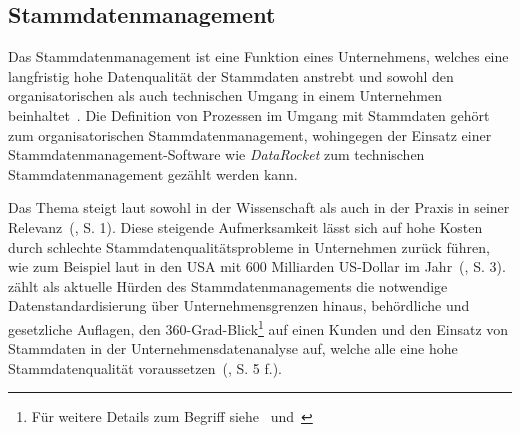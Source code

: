 \documentclass[
  language=german, %
  type=bachelor%
]{isthesis}
\begin{document}
\begin{content}


  \section{Stammdatenmanagement}
	Das Stammdatenmanagement ist eine Funktion eines Unternehmens, welches eine
	langfristig hohe Datenqualität der Stammdaten anstrebt und sowohl den
	organisatorischen als auch technischen Umgang in einem Unternehmen
	beinhaltet~\cite[][S.  2]{legner2007stammdaten}.  Die Definition von
	Prozessen im Umgang mit Stammdaten gehört \zB{} zum organisatorischen
	Stammdatenmanagement, wohingegen der Einsatz einer Stammdatenmanagement-Software
	wie \textit{DataRocket} zum technischen Stammdatenmanagement gezählt werden
	kann.  

  Das Thema steigt laut \textsc{\citeauthor{otto2012design}} sowohl in der
  Wissenschaft als auch in der Praxis in seiner
  Relevanz~(\citeyear{otto2012design}, S. 1). Diese steigende Aufmerksamkeit
  lässt sich auf hohe Kosten durch schlechte Stammdatenqualitätsprobleme in
  Unternehmen zurück führen, wie zum Beispiel laut
  \textsc{\citeauthor{eckerson2002data}} in den USA mit 600 Milliarden
  US-Dollar im Jahr~(\cite{eckerson2002data}, S. 3).
  \textsc{\citeauthor{otto2011stammdatenmanagement}} zählt als aktuelle Hürden
  des Stammdatenmanagements die notwendige Datenstandardisierung über
  Unternehmensgrenzen hinaus, behördliche und gesetzliche Auflagen, den
  360-Grad-Blick\footnote{Für weitere Details zum Begriff
  siehe~\cite{kotorov2003customer} und~\cite{otto2016master}} auf einen Kunden
  und den Einsatz von Stammdaten in der Unternehmensdatenanalyse auf, welche
  alle eine hohe Stammdatenqualität
  voraussetzen~(\citeyear{otto2011stammdatenmanagement}, S. 5 f.).


\end{content}
\end{document}
